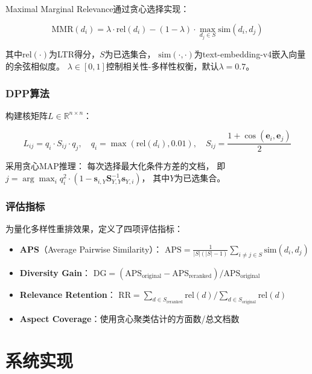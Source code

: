 \documentclass[10pt,a4paper]{article}
\begin{document}
Maximal Marginal Relevance通过贪心选择实现：

\begin{equation}
\text{MMR}(d_i) = \lambda \cdot \text{rel}(d_i) - (1-\lambda) \cdot \max_{d_j \in S} \text{sim}(d_i, d_j)
\end{equation}

其中$\text{rel}(\cdot)$为LTR得分，$S$为已选集合，
$\text{sim}(\cdot, \cdot)$为text-embedding-v4嵌入向量的余弦相似度。
$\lambda \in [0,1]$控制相关性-多样性权衡，默认$\lambda=0.7$。

\subsubsection{DPP算法}

构建核矩阵$L \in \mathbb{R}^{n \times n}$：

\begin{equation}
L_{ij} = q_i \cdot S_{ij} \cdot q_j, \quad
q_i = \max(\text{rel}(d_i), 0.01), \quad
S_{ij} = \frac{1 + \cos(\mathbf{e}_i, \mathbf{e}_j)}{2}
\end{equation}

采用贪心MAP推理\cite{chen2018dpp}：
每次选择最大化条件方差的文档，
即$j = \arg\max_i q_i^2 \cdot (1 - \mathbf{s}_{i,Y} \mathbf{S}_{Y,Y}^{-1} \mathbf{s}_{Y,i})$，
其中$Y$为已选集合。

\subsubsection{评估指标}

为量化多样性重排效果，定义了四项评估指标：

\begin{itemize}[leftmargin=*]
    \item \textbf{APS}（Average Pairwise Similarity）：
    $\text{APS} = \frac{1}{|S|(|S|-1)} \sum_{i \neq j \in S} \text{sim}(d_i, d_j)$
    \item \textbf{Diversity Gain}：
    $\text{DG} = (\text{APS}_{\text{original}} - \text{APS}_{\text{reranked}}) / \text{APS}_{\text{original}}$
    \item \textbf{Relevance Retention}：
    $\text{RR} = \sum_{d \in S_{\text{reranked}}} \text{rel}(d) / \sum_{d \in S_{\text{original}}} \text{rel}(d)$
    \item \textbf{Aspect Coverage}：使用贪心聚类估计的方面数/总文档数
\end{itemize}

\section{系统实现}
\end{document}
